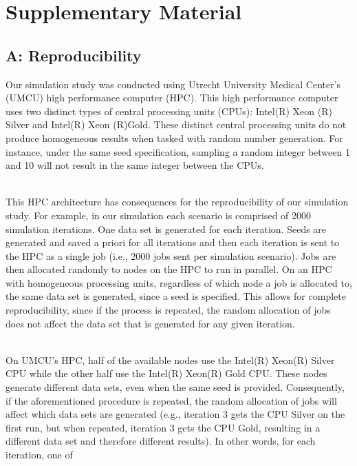 \documentclass[
]{article}
\author{}
\date{\vspace{-2.5em}}
\begin{document}
\hypertarget{supplementary-material}{%
\section{Supplementary Material}\label{supplementary-material}}

\hypertarget{a-reproducibility}{%
\subsection{A: Reproducibility}\label{a-reproducibility}}

Our simulation study was conducted using Utrecht University Medical
Center's (UMCU) high performance computer (HPC). This high performance
computer uses two distinct types of central processing units (CPUs):
Intel(R) Xeon (R) Silver and Intel(R) Xeon (R)Gold. These distinct
central processing units do not produce homogeneous results when tasked
with random number generation. For instance, under the same seed
specification, sampling a random integer between 1 and 10 will not
result in the same integer between the CPUs.\\
\strut \\
This HPC architecture has consequences for the reproducibility of our
simulation study. For example, in our simulation each scenario is
comprised of 2000 simulation iterations. One data set is generated for
each iteration. Seeds are generated and saved a priori for all
iterations and then each iteration is sent to the HPC as a single job
(i.e., 2000 jobs sent per simulation scenario). Jobs are then allocated
randomly to nodes on the HPC to run in parallel. On an HPC with
homogeneous processing units, regardless of which node a job is
allocated to, the same data set is generated, since a seed is specified.
This allows for complete reproducibility, since if the process is
repeated, the random allocation of jobs does not affect the data set
that is generated for any given iteration.\\
\strut \\
On UMCU's HPC, half of the available nodes use the Intel(R) Xeon(R)
Silver CPU while the other half use the Intel(R) Xeon(R) Gold CPU. These
nodes generate different data sets, even when the same seed is provided.
Consequently, if the aforementioned procedure is repeated, the random
allocation of jobs will affect which data sets are generated (e.g.,
iteration 3 gets the CPU Silver on the first run, but when repeated,
iteration 3 gets the CPU Gold, resulting in a different data set and
therefore different results). In other words, for each iteration, one of
\end{document}
